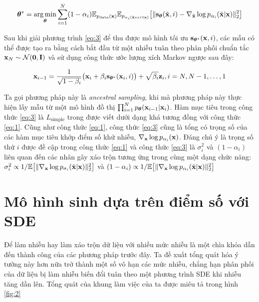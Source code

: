 \documentclass{article} %
\begin{document}
\begin{equation} \label{eq:3}
    \boldsymbol{\theta}^{\ast} = \operatorname*{arg\,min}_{\boldsymbol{\theta}} \sum_{i=1}^N (1 - \alpha_i) \mathbb{E}_{p_{\mathrm{data}}(\bold{x})} \mathbb{E}_{p_{\alpha_i (\tilde{\bold{x}} vert \bold{x})}} \big \lbrack \lVert \bold{s}_{\boldsymbol{\theta}} (\tilde{\bold{x}}, i) - \nabla_{\tilde{\bold{x}}} \log p_{\alpha_i} (\tilde{\bold{x}} \vert \bold{x}) \rVert_2^2 \big \rbrack
\end{equation}

Sau khi giải phương trình \ref{eq:3} để thu được mô hình tối ưu $\bold{s}_{\boldsymbol{\theta}^{\ast}}(\bold{x}, i)$, các mẫu có thể được tạo ra bằng cách bắt đầu từ một nhiễu tuân theo phân phối chuẩn tắc $\bold{x}_N \sim \mathcal{N}(\bold{0}, \bold{I})$ và sử dụng công thức ước lượng xích Markov ngược sau đây:

\begin{equation} \label{eq:4}
    \bold{x}_{i-1} = \dfrac{1}{\sqrt{1-\beta_i}} \big( \bold{x}_i + \beta_i \bold{s}_{\boldsymbol{\theta}^{\ast}} (\bold{x}_i, i) \big) + \sqrt{\beta_i} \bold{z}_i, i = N, N-1, \dots, 1
\end{equation}

Ta gọi phương pháp này là \textit{ancestral sampling}, khi mà phương pháp này thực hiện lấy mẫu từ một mô hình đồ thị $\prod_{i=1}^N p_{\boldsymbol{\theta}} (\bold{x}_{i-1} \vert \bold{x}_i)$.
Hàm mục tiêu trong công thức \ref{eq:3} là $L_{\mathrm{simple}}$ trong \citep{ho2020denoising} được viết dưới dạng khá tương đồng với công thức \ref{eq:1}.
Cũng như công thức \ref{eq:1}, công thức \ref{eq:3} cũng là tổng có trọng số của các hàm mục tiêu khớp điểm số khử nhiễu, $\nabla_{\bold{x}}\log p_{\alpha_i}(\bold{x})$.
Đáng chú ý là trọng số thứ $i$ được đề cập trong công thức \ref{eq:1} và công thức \ref{eq:3} là $\sigma_i^2$ và $(1-\alpha_i)$ liên quan đến các nhân gây xáo trộn tương ứng trong cùng một dạng chức năng:
$\sigma_i^2 \propto 1/\mathbb{E} \big \lbrack \lVert \nabla_{\bold{x}} \log p_{\sigma_i} (\tilde{\bold{x}} \vert \bold{x}) \rVert_2^2 \big \rbrack$ và $(1-\alpha_i) \propto 1/\mathbb{E} \big \lbrack \lVert \nabla_\bold{x} \log p_{\alpha_i}  (\tilde{\bold{x}} \vert \bold{x})\rVert_2^2 \big \rbrack$

\section{Mô hình sinh dựa trên điểm số với SDE}

Để làm nhiễu hay làm xáo trộn dữ liệu với nhiều mức nhiễu là một chìa khóa dẫn đến thành công của các phương pháp trước đây.
Ta đề xuất tổng quát hóa ý tưởng này hơn nữa trở thành một số vô hạn các mức nhiễu, chẳng hạn phân phối của dữ liệu bị làm nhiễu biến đổi tuân theo một phương trình SDE khi nhiễu tăng dần lên.
Tổng quát của khung làm việc của ta được miêu tả trong hình \ref{fig:2}
\end{document}
